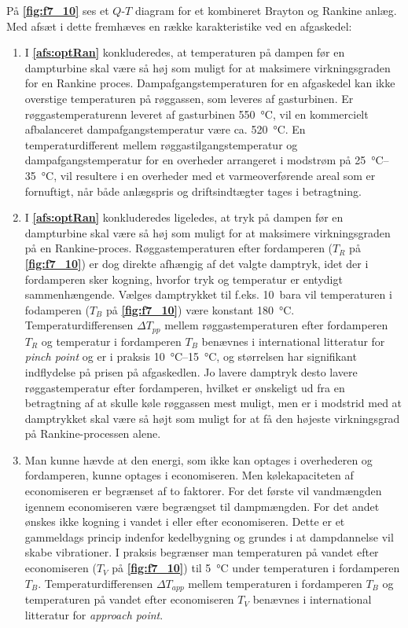På \textbf{\autoref{fig:f7_10}} ses et $Q$-$T$ diagram for et kombineret Brayton og Rankine anlæg. Med afsæt i dette fremhæves en række karakteristike ved en afgaskedel:
\begin{enumerate}
  \item I \textbf{\autoref{afs:optRan}} konkluderedes, at temperaturen på dampen før en dampturbine skal være så høj som muligt for at maksimere virkningsgraden for en Rankine proces. Dampafgangstemperaturen for en afgaskedel kan ikke overstige temperaturen på røggassen, som leveres af gasturbinen. Er røggastemperaturenn leveret af gasturbinen \qty{550}{\celsius}, vil en kommercielt afbalanceret dampafgangstemperatur være ca. \qty{520}{\celsius}. En temperaturdifferent mellem røggastilgangstemperatur og dampafgangstemperatur for en overheder arrangeret i modstrøm på \qty{25}{\celsius}--\qty{35}{\celsius}, vil resultere i en overheder med et varmeoverførende areal som er fornuftigt, når både anlægspris og driftsindtægter tages i betragtning.
  \item I \textbf{\autoref{afs:optRan}} konkluderedes ligeledes, at tryk på dampen før en dampturbine skal være så høj som muligt for at maksimere virkningsgraden på en Rankine-proces. Røggastemperaturen efter fordamperen ($T_R$ på \textbf{\autoref{fig:f7_10}}) er dog direkte afhængig af det valgte damptryk, idet der i fordamperen sker kogning, hvorfor tryk og temperatur er entydigt sammenhængende. Vælges damptrykket til f.eks. \qty{10}{bara} vil temperaturen i fodamperen ($T_B$ på \textbf{\autoref{fig:f7_10}}) være konstant \qty{180}{\celsius}. Temperaturdifferensen $\Delta T_{pp}$ mellem røggastemperaturen efter fordamperen $T_R$ og temperatur i fordamperen $T_B$ benævnes i international litteratur for \textit{pinch point} og er i praksis \qty{10}{\celsius}--\qty{15}{\celsius}, og størrelsen har signifikant indflydelse på prisen på afgaskedlen. Jo lavere damptryk desto lavere røggastemperatur efter fordamperen, hvilket er ønskeligt ud fra en betragtning af at skulle køle røggassen mest muligt, men er i modstrid med at damptrykket skal være så højt som muligt for at få den højeste virkningsgrad på Rankine-processen alene.
  \item Man kunne hævde at den energi, som ikke kan optages i overhederen og fordamperen, kunne optages i economiseren. Men kølekapaciteten af economiseren er begrænset af to faktorer. For det første vil vandmængden igennem economiseren være begrængset til dampmængden. For det andet ønskes ikke kogning i vandet i eller efter economiseren. Dette er et gammeldags princip indenfor kedelbygning og grundes i at dampdannelse vil skabe vibrationer. I praksis begrænser man temperaturen på vandet efter economiseren ($T_V$ på \textbf{\autoref{fig:f7_10}}) til \qty{5}{\celsius} under temperaturen i fordamperen $T_B$. Temperaturdifferensen $\Delta T_{app}$ mellem temperaturen i fordamperen $T_B$ og temperaturen på vandet efter economiseren $T_V$ benævnes i international litteratur for \textit{approach point}. 
\end{enumerate}

